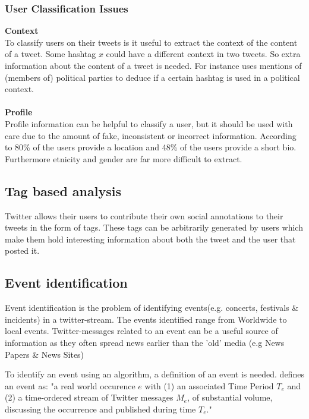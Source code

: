 \documentclass{article}
\begin{document}
\subsubsection{User Classification Issues}
\textbf{Context}\\
To classify users on their tweets is it useful to extract the context of the content of a tweet. Some hashtag $x$ could have a different context in two tweets. So extra information about the content of a tweet is needed. For instance \cite{userclasst} uses mentions of (members of) political parties to deduce if a certain hashtag is used in a political context. 
\\\\
\textbf{Profile}\\
Profile information can be helpful to classify a user, but it should be used with care due to the amount of fake, inconsistent or incorrect information. According to \cite{usermachine} 80\% of the users provide a location and 48\% of the users provide a short bio. Furthermore etnicity and gender are far more difficult to extract. 

\subsection{Tag based analysis}

Twitter allows their users to contribute their own social annotations to their tweets in the form of tags. These tags can be arbitrarily generated by users 
which make them hold interesting information about both the tweet and the user that posted it.

\subsection{Event identification}

Event identification is the problem of identifying events(e.g. concerts, festivals \& incidents) in a twitter-stream. The events identified range from Worldwide to local events. Twitter-messages related to an event can be a useful source of information as they often spread news earlier than the 'old' media (e.g News Papers \& News Sites)

To identify an event using an algorithm, a definition of an event is needed. \cite{eventident} defines an event as: "a real world occurence $e$ with (1) an associated Time Period $T_e$ and (2) a time-ordered stream of Twitter messages $M_e$, of substantial volume, discussing the
occurrence and published during time $T_e$."
\end{document}
